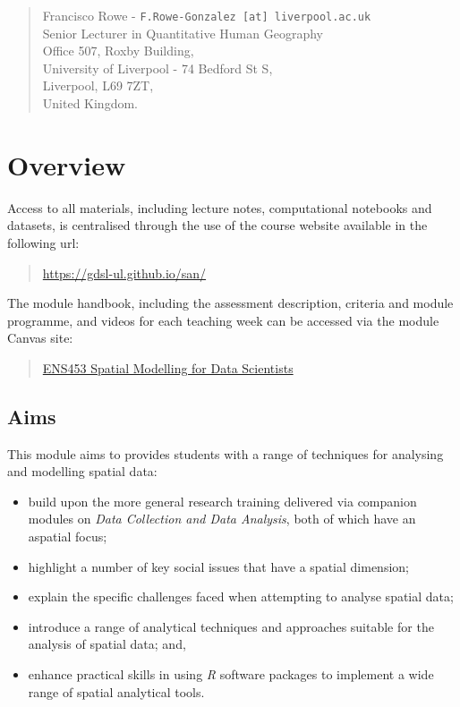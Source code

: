 \documentclass[
  letterpaper,
  DIV=11,
  numbers=noendperiod]{scrreprt}
\providecommand{\tightlist}{%
  \setlength{\itemsep}{0pt}\setlength{\parskip}{0pt}}\usepackage{longtable,booktabs,array}
\begin{document}
\begin{quote}
Francisco Rowe - \texttt{F.Rowe-Gonzalez\ {[}at{]}\ liverpool.ac.uk}\\
Senior Lecturer in Quantitative Human Geography\\
Office 507, Roxby Building,\\
University of Liverpool - 74 Bedford St S,\\
Liverpool, L69 7ZT,\\
United Kingdom.
\end{quote}


\hypertarget{overview}{%
\chapter{Overview}\label{overview}}

Access to all materials, including lecture notes, computational
notebooks and datasets, is centralised through the use of the course
website available in the following url:

\begin{quote}
\url{https://gdsl-ul.github.io/san/}
\end{quote}

The module handbook, including the assessment description, criteria and
module programme, and videos for each teaching week can be accessed via
the module Canvas site:

\begin{quote}
\href{https://liverpool.instructure.com}{ENS453 Spatial Modelling for
Data Scientists}
\end{quote}

\hypertarget{aims}{%
\section{Aims}\label{aims}}

This module aims to provides students with a range of techniques for
analysing and modelling spatial data:

\begin{itemize}
\tightlist
\item
  build upon the more general research training delivered via companion
  modules on \emph{Data Collection and Data Analysis}, both of which
  have an aspatial focus;
\item
  highlight a number of key social issues that have a spatial dimension;
\item
  explain the specific challenges faced when attempting to analyse
  spatial data;
\item
  introduce a range of analytical techniques and approaches suitable for
  the analysis of spatial data; and,
\item
  enhance practical skills in using \emph{R} software packages to
  implement a wide range of spatial analytical tools.
\end{itemize}
\end{document}
